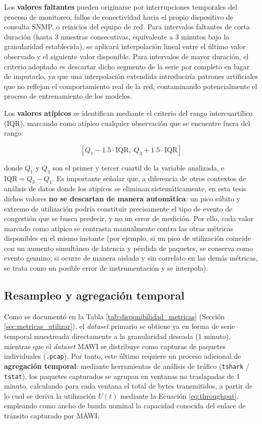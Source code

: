 \documentclass[12pt]{report}
\begin{document}
Los \textbf{valores faltantes} pueden originarse por interrupciones temporales del proceso de monitoreo, fallos de conectividad hacia el propio dispositivo de consulta SNMP, o reinicios del equipo de red. Para intervalos faltantes de corta duración (hasta 3 muestras consecutivas, equivalente a 3 minutos bajo la granularidad establecida), se aplicará interpolación lineal entre el último valor observado y el siguiente valor disponible. Para intervalos de mayor duración, el criterio adoptado es descartar dicho segmento de la serie por completo en lugar 
de imputarlo, ya que una interpolación extendida introduciría patrones artificiales que no reflejan el comportamiento real de la red, contaminando potencialmente el proceso de entrenamiento de los modelos.

Los \textbf{valores atípicos} se identifican mediante el criterio del rango intercuartílico (IQR), marcando como atípico cualquier observación que se encuentre fuera del rango:

\begin{equation}
    \left[Q_1 - 1.5 \cdot \mbox{IQR},\; Q_3 + 1.5 \cdot \mbox{IQR}\right]
    \label{eq:iqr}
\end{equation}

donde $Q_1$ y $Q_3$ son el primer y tercer cuartil de la variable analizada, e $\mbox{IQR} = Q_3 - Q_1$. Es importante señalar que, a diferencia de otros contextos de análisis de datos donde los atípicos se eliminan sistemáticamente, en esta tesis dichos valores \textbf{no se descartan de manera automática}: un pico súbito y extremo de utilización podría constituir precisamente el tipo de evento de congestión que se busca predecir, y no un error de medición. Por ello, cada valor marcado como atípico se contrasta manualmente contra las otras métricas 
disponibles en el mismo instante (por ejemplo, si un pico de utilización coincide con un aumento simultáneo de latencia y pérdida de paquetes, se conserva como evento genuino; si ocurre de manera aislada y sin correlato en las demás métricas, se trata como un posible error de instrumentación y se interpola).

\subsection*{Resampleo y agregación temporal}

Como se documentó en la Tabla \ref{tab:disponibilidad_metricas} (Sección \ref{sec:metricas_utilizar}), el \textit{dataset} primario se obtiene ya en forma de serie temporal muestreada directamente a la granularidad deseada (1 minuto), mientras que el \textit{dataset} MAWI se distribuye como capturas de paquetes individuales (\texttt{.pcap}). Por tanto, este último requiere un proceso adicional de \textbf{agregación temporal}: mediante herramientas de análisis de tráfico (\texttt{tshark} / \texttt{tstat}), los paquetes capturados se agrupan en ventanas 
no traslapadas de 1 minuto, calculando para cada ventana el total de bytes transmitidos, a partir de lo cual se deriva la utilización $U(t)$ mediante la Ecuación \ref{eq:throughput}, empleando como ancho de banda nominal la capacidad conocida del enlace de tránsito capturado por MAWI.
\end{document}
